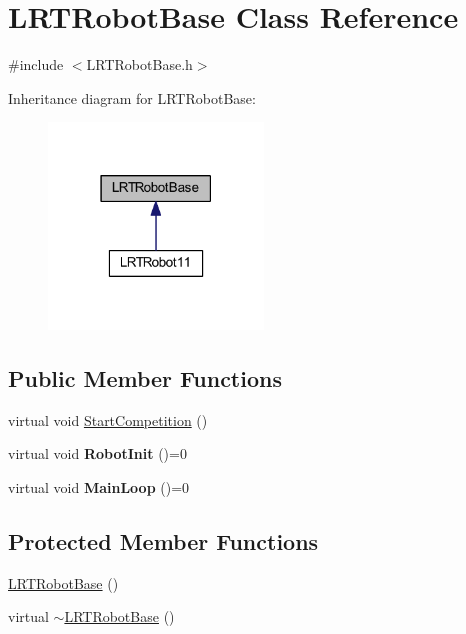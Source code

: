 \hypertarget{class_l_r_t_robot_base}{
\section{\-L\-R\-T\-Robot\-Base \-Class \-Reference}
\label{class_l_r_t_robot_base}
}


{\ttfamily \#include $<$\-L\-R\-T\-Robot\-Base.\-h$>$}



\-Inheritance diagram for \-L\-R\-T\-Robot\-Base\-:\nopagebreak
\begin{figure}[H]
\begin{center}
\leavevmode
\includegraphics[width=162pt]{class_l_r_t_robot_base__inherit__graph}
\end{center}
\end{figure}
\subsection*{\-Public \-Member \-Functions}
\begin{DoxyCompactItemize}
\item 
virtual void \hyperlink{class_l_r_t_robot_base_a242e46650b04f58baaa6c3c585a15634}{\-Start\-Competition} ()
\item 
\hypertarget{class_l_r_t_robot_base_a8c1344352ad07a31cb4813433d2a30f1}{
virtual void {\bfseries \-Robot\-Init} ()=0}
\label{class_l_r_t_robot_base_a8c1344352ad07a31cb4813433d2a30f1}

\item 
\hypertarget{class_l_r_t_robot_base_af9508c789c4fe6248e327f0e4a853834}{
virtual void {\bfseries \-Main\-Loop} ()=0}
\label{class_l_r_t_robot_base_af9508c789c4fe6248e327f0e4a853834}

\end{DoxyCompactItemize}
\subsection*{\-Protected \-Member \-Functions}
\begin{DoxyCompactItemize}
\item 
\hyperlink{class_l_r_t_robot_base_a30dd1efa256483acec95edfd56435231}{\-L\-R\-T\-Robot\-Base} ()
\item 
virtual \hyperlink{class_l_r_t_robot_base_af12bef7e14e5f661b4c86f9d63158db2}{$\sim$\-L\-R\-T\-Robot\-Base} ()
\end{DoxyCompactItemize}
